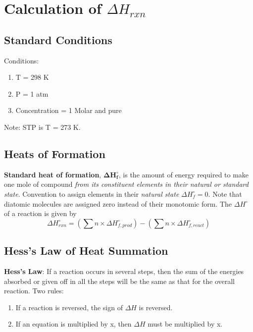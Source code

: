 \documentclass[../GChemReview.tex]{subfiles}
\begin{document}
	\section{Calculation of $ \Delta H_{rxn} $}
	
	\subsection{Standard Conditions}
	
	Conditions:
	\begin{enumerate}
		\item T = 298 K
		\item P = 1 atm
		\item Concentration = 1 Molar and pure
	\end{enumerate}
	Note: STP is T = 273 K.
	
	\subsection{Heats of Formation}
	
	\textbf{Standard heat of formation}, $ \boldsymbol{\Delta H_{f}^{\circ}} $, is the amount of energy required to make one mole of compound \emph{from its constituent elements in their natural or standard state}. Convention to assign elements in their \emph{natural state} $ \Delta H_{f}^{\circ} = 0$. Note that diatomic molecules are assigned zero instead of their monotomic form. The $ \Delta H^{\circ} $ of a reaction is given by
	\begin{equation}
		\Delta H_{rxn}^{\circ} = (\sum n \times \Delta H_{f,prod}^{\circ}) - (\sum n \times \Delta H_{f,react}^{\circ})
	\end{equation}
	
	\subsection{Hess's Law of Heat Summation}
	
	\textbf{Hess's Law}: If a reaction occurs in several steps, then the sum of the energies absorbed or given off in all the steps will be the same as that for the overall reaction. Two rules:
	\begin{enumerate}
		\item If a reaction is reversed, the sign of $ \Delta H $ is reversed.
		\item If an equation is multiplied by x, then $ \Delta H $ must be multiplied by x.
	\end{enumerate}
	
\end{document}
